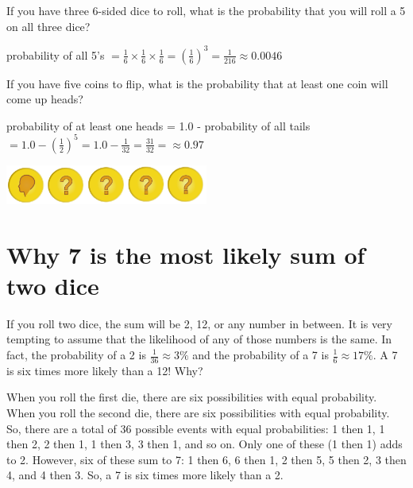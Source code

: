 \begin{Exercise}[title={Rolling Dice}, label=rolling-dice]
  If you have three 6-sided dice to roll, what is the
  probability that you will roll a 5 on all three dice?
\end{Exercise}
\begin{Answer}[ref=rolling-dice]
  probability of all 5's $ = \frac{1}{6}\times\frac{1}{6}\times\frac{1}{6} = \left(\frac{1}{6}\right)^3 = \frac{1}{216} \approx 0.0046$
  \end{Answer}
    
\begin{Exercise}[title={Flipping Coins}, label=flipping-coins]
  If you have five coins to flip, what is the
  probability that at least one coin will come up heads?
\end{Exercise}
\begin{Answer}[ref=rolling-dice]
  probability of at least one heads = 1.0 - probability of all tails $ = 1.0 - \left(\frac{1}{2}\right)^5 =1.0 - \frac{1}{32} = \frac{31}{32} = \approx 0.97$ 

  \includegraphics[width=0.5\textwidth]{coin_prob.png}
\end{Answer}
    
\section{Why 7 is the most likely sum of two dice}

If you roll two dice, the sum will be 2, 12, or any number in
between. It is very tempting to assume that the likelihood of any of
those numbers is the same. In fact, the probability of a 2 is
$\frac{1}{36} \approx 3\%$ and the probability of a 7 is $\frac{1}{6}
\approx 17\%$. A 7 is six times more likely than a 12! Why?

When you roll the first die, there are six possibilities with equal
probability. When you roll the second die, there are six possibilities
with equal probability. So, there are a total of 36 possible events
with equal probabilities: 1 then 1, 1 then 2, 2 then 1, 1 then 3, 3
then 1, and so on. Only one of these (1 then 1) adds to 2.  However, six of these
sum to 7: 1 then 6, 6 then 1, 2 then 5, 5 then 2, 3 then 4, and 4 then
3. So, a 7 is six times more likely than a 2.

